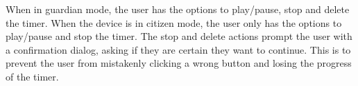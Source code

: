 When in guardian mode, the user has the options to play/pause, stop and delete the timer. When the device is in citizen mode, the user only has the options to play/pause and stop the timer. The stop and delete actions prompt the user with a confirmation dialog, asking if they are certain they want to continue. This is to prevent the user from mistakenly clicking a wrong button and losing the progress of the timer.